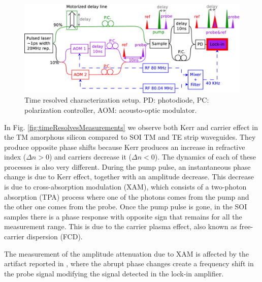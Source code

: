 \documentclass[10pt,letterpaper]{article}
\begin{document}
\begin{figure}[htb]
    \centering
    \includegraphics[width=1.0\textwidth]{timeResolved9}
    \caption{Time resolved characterization setup. PD: photodiode, PC: polarization controller, AOM: acousto-optic modulator.}
    \label{fig:setupTimeRes}
\end{figure}



In Fig. \ref{fig:timeResolvesMeasurements} we observe both Kerr and carrier effect in the TM amorphous silicon compared to SOI TM and TE strip waveguides. They produce opposite phase shifts because Kerr produces an increase in refractive index ($ \Delta n > 0 $) and carriers decrease it ($ \Delta n < 0 $).  The dynamics of each of these processes is also very different. During the pump pulse, an instantaneous phase change is due to Kerr effect, together with an amplitude decrease. This decrease is due to cross-absorption modulation (XAM), which consists of a two-photon absorption (TPA) process where one of the photons comes from the pump and the other one comes from the probe. Once the pump pulse is gone, in the SOI samples there is a phase response with opposite sign that remains for all the measurement range. This is due to the carrier plasma effect, also known as free-carrier dispersion (FCD). 


The measurement of the amplitude attenuation due to XAM is affected by the artifact reported in \cite{Vallaitis2009}, where the abrupt phase changes create a frequency shift in the probe signal modifying the signal detected in the lock-in amplifier.

\end{document}

